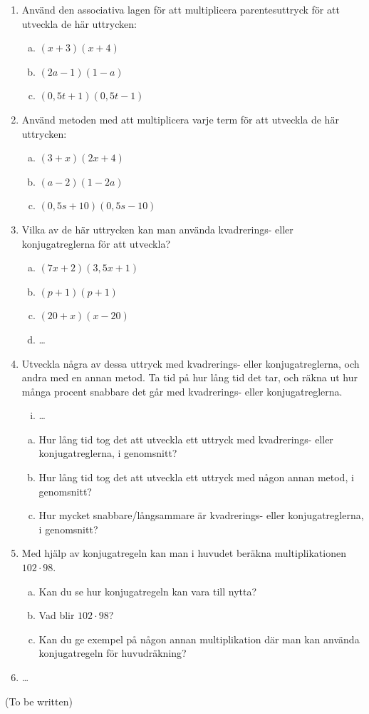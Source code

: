 \begin{enumerate}
  \item Använd den associativa lagen för att multiplicera parentesuttryck för att utveckla de här uttrycken:
  \begin{enumerate}[a)]
    \item $(x+3)(x+4)$
    \item $(2a-1)(1-a)$
    \item $(0{,}5t+1)(0{,}5t-1)$
  \end{enumerate}
  \item Använd metoden med att multiplicera varje term för att utveckla de här uttrycken:
  \begin{enumerate}[a)]
    \item $(3+x)(2x+4)$
    \item $(a-2)(1-2a)$
    \item $(0{,}5s+10)(0{,}5s-10)$
  \end{enumerate}
  \item Vilka av de här uttrycken kan man använda kvadrerings- eller konjugatreglerna för att utveckla?
  \begin{enumerate}[a)]
    \item $(7x+2)(3{,}5x+1)$
    \item $(p+1)(p+1)$
    \item $(20+x)(x-20)$
    \item \ldots
  \end{enumerate}
  \item Utveckla några av dessa uttryck med kvadrerings- eller konjugatreglerna, och andra med en annan metod.
  Ta tid på hur lång tid det tar, och räkna ut hur många procent snabbare det går med kvadrerings- eller konjugatreglerna.
  \begin{enumerate}[i)]
    \item \ldots
  \end{enumerate}
  \begin{enumerate}[a)]
    \item Hur lång tid tog det att utveckla ett uttryck med kvadrerings- eller konjugatreglerna, i genomsnitt?
    \item Hur lång tid tog det att utveckla ett uttryck med någon annan metod, i genomsnitt?
    \item Hur mycket snabbare/långsammare är kvadrerings- eller konjugatreglerna, i genomsnitt?
  \end{enumerate}
  \item Med hjälp av konjugatregeln kan man i huvudet beräkna multiplikationen $102 \cdot 98$.
  \begin{enumerate}[a)]
    \item Kan du se hur konjugatregeln kan vara till nytta?
    \item Vad blir $102 \cdot 98$?
    \item Kan du ge exempel på någon annan multiplikation där man kan använda konjugatregeln för huvudräkning?
  \end{enumerate}
  \item \ldots
  
\end{enumerate}

(To be written)
